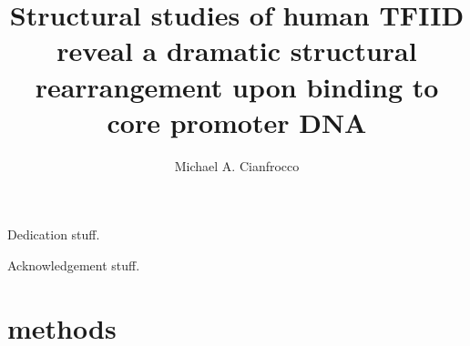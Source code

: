\documentclass{ucbthesis}
\begin{document}

\title{Structural studies of human TFIID reveal a dramatic structural rearrangement upon binding to core promoter DNA}
\author{Michael A. Cianfrocco}


\maketitle
\approvalpage
\copyrightpage



\begin{frontmatter}

\begin{dedication}
\null\vfil
\begin{center}
Dedication stuff.
\end{center}
\vfil\null
\end{dedication}

\tableofcontents
\clearpage
\listoffigures
\clearpage

\begin{acknowledgements}
Acknowledgement stuff.
\end{acknowledgements}

\end{frontmatter}

\pagestyle{headings}


%
%
%


\appendix
\chapter{methods}

\printnomenclature
\printbibliography
\end{document}
